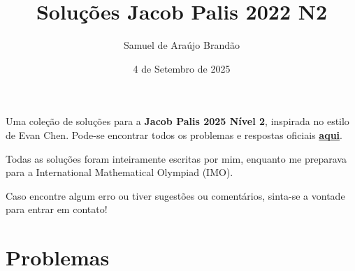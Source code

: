 \documentclass[12pt]{article}
\title{\sffamily\bfseries{Soluções Jacob Palis 2022 N2}}
\author{Samuel de Araújo Brandão}
\date{4 de Setembro de 2025}
\begin{document}
  \maketitle
  Uma coleção de soluções para a \textbf{Jacob Palis 2025 Nível 2}, inspirada no estilo de Evan Chen.
  Pode-se encontrar todos os problemas e respostas oficiais 
  \textbf{\href{https://www.obm.org.br/content/uploads/2025/06/provas_jacob_palis_2025.pdf}{aqui}}.

  Todas as soluções foram inteiramente escritas por mim, enquanto me preparava para a
  International Mathematical Olympiad (IMO).

  Caso encontre algum erro ou tiver sugestões ou comentários, sinta-se a vontade 
  para entrar em contato!

  \tableofcontents

  \clearpage

  \section{\textsf{Problemas}}
\end{document}
